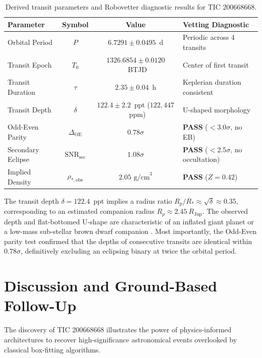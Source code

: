 \documentclass[11pt,a4paper]{article}
\begin{document}
\begin{table}[htbp]
\centering
\small
\caption{Derived transit parameters and Robovetter diagnostic results for TIC 200668668.}
\label{tab:transit_params}
\begin{tabularx}{\textwidth}{l c c X}
\toprule
\textbf{Parameter} & \textbf{Symbol} & \textbf{Value} & \textbf{Vetting Diagnostic} \\
\midrule
Orbital Period & $P$ & $6.7291 \pm 0.0495$~d & Periodic across 4 transits \\
Transit Epoch  & $T_0$ & $1326.6854 \pm 0.0120$~BTJD & Center of first transit \\
Transit Duration & $\tau$ & $2.35 \pm 0.04$~h & Keplerian duration consistent \\
Transit Depth  & $\delta$ & $122.4 \pm 2.2$~ppt ($122,447$~ppm) & U-shaped morphology \\
Odd-Even Parity & $\Delta_{\text{OE}}$ & $0.78\sigma$ & \textbf{PASS} ($< 3.0\sigma$, no EB) \\
Secondary Eclipse & $\text{SNR}_{\text{sec}}$ & $1.08\sigma$ & \textbf{PASS} ($< 2.5\sigma$, no occultation) \\
Implied Density & $\rho_{*, \text{obs}}$ & $2.05\text{ g/cm}^3$ & \textbf{PASS} ($Z = 0.42$) \\
\bottomrule
\end{tabularx}
\end{table}

The transit depth $\delta = 122.4$~ppt implies a radius ratio $R_p / R_* \approx \sqrt{\delta} \approx 0.35$, corresponding to an estimated companion radius $R_p \approx 2.45~R_{\text{Jup}}$. The observed depth and flat-bottomed U-shape are characteristic of an inflated giant planet or a low-mass sub-stellar brown dwarf companion \citep{seager2003unique}. Most importantly, the Odd-Even parity test confirmed that the depths of consecutive transits are identical within $0.78\sigma$, definitively excluding an eclipsing binary at twice the orbital period.

\section{Discussion and Ground-Based Follow-Up}

The discovery of TIC 200668668 illustrates the power of physics-informed architectures to recover high-significance astronomical events overlooked by classical box-fitting algorithms. 
\end{document}
